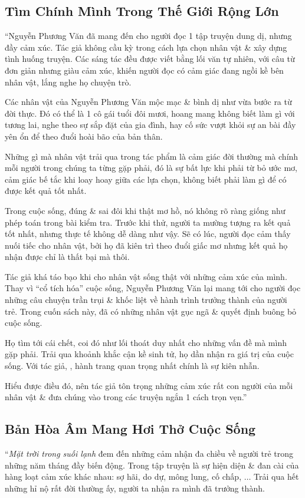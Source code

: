 \documentclass[oneside]{book}
\numberwithin{equation}{section}
\begin{document}
\subsection{Tìm Chính Mình Trong Thế Giới Rộng Lớn}
``Nguyễn Phương Văn đã mang đến cho người đọc 1 tập truyện dung dị, nhưng đầy cảm xúc. Tác giả không cầu kỳ trong cách lựa chọn nhân vật \& xây dựng tình huống truyện. Các sáng tác đều được viết bằng lối văn tự nhiên, với câu từ đơn giản nhưng giàu cảm xúc, khiến người đọc có cảm giác đang ngồi kề bên nhân vật, lắng nghe họ chuyện trò.

Các nhân vật của Nguyễn Phương Văn mộc mạc \& bình dị như vừa bước ra từ đời thực. Đó có thể là 1 cô gái tuổi đôi mươi, hoang mang không biết làm gì với tương lai, nghe theo sự sắp đặt của gia đình, hay cố sức vượt khỏi sự an bài đầy yên ổn để theo đuổi hoài bão của bản thân.

Những gì mà nhân vật trải qua trong tác phẩm là cảm giác đời thường mà chính mỗi người trong chúng ta từng gặp phải, đó là sự bất lực khi phải từ bỏ ước mơ, cảm giác bế tắc khi loay hoay giữa các lựa chọn, không biết phải làm gì để có được kết quả tốt nhất.

Trong cuộc sống, đúng \& sai đôi khi thật mơ hồ, nó không rõ ràng giống như phép toán trong bài kiểm tra. Trước khi thử, người ta mường tượng ra kết quả tốt nhất, nhưng thực tế không dễ dàng như vậy. Sẽ có lúc, người đọc cảm thấy nuối tiếc cho nhân vật, bởi họ đã kiên trì theo đuổi giấc mơ nhưng kết quả họ nhận được chỉ là thất bại mà thôi.

Tác giả khá táo bạo khi cho nhân vật sống thật với những cảm xúc của mình. Thay vì ``cổ tích hóa'' cuộc sống, Nguyễn Phương Văn lại mang tới cho người đọc những câu chuyện trần trụi \& khốc liệt về hành trình trưởng thành của người trẻ. Trong cuốn sách này, đã có những nhân vật gục ngã \& quyết định buông bỏ cuộc sống.

Họ tìm tới cái chết, coi đó như lối thoát duy nhất cho những vấn đề mà mình gặp phải. Trải qua khoảnh khắc cận kề sinh tử, họ dần nhận ra giá trị của cuộc sống. Với tác giả, , hành trang quan trọng nhất chính là sự kiên nhẫn.

 Hiểu được điều đó, nên tác giả tôn trọng những cảm xúc rất con người của mỗi nhân vật \& đưa chúng vào trong các truyện ngắn 1 cách trọn vẹn.''

\subsection{Bản Hòa Âm Mang Hơi Thở Cuộc Sống}
``\textit{Mặt trời trong suối lạnh} đem đến những cảm nhận đa chiều về người trẻ trong những năm tháng đầy biến động. Trong tập truyện là sự hiện diện \& đan cài của hàng loạt cảm xúc khác nhau: sợ hãi, do dự, mông lung, cố chấp, $\ldots$ Trải qua hết những hỉ nộ rất đời thường ấy, người ta nhận ra mình đã trưởng thành.
\end{document}
